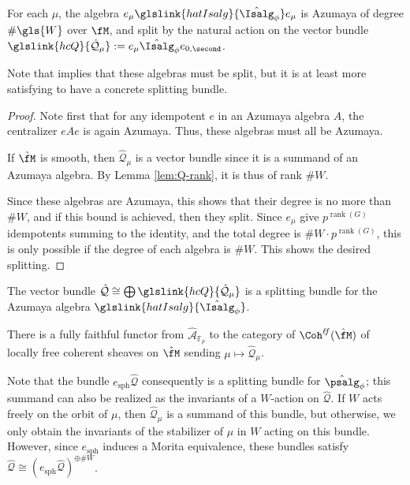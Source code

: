 \begin{lemma}
  For each $\mu$, the algebra $e_\mu\glslink{hatIsalg}{\hat{\Isalg}_\phi} e_\mu$ is Azumaya of degree $\#\gls{W}$ over $\fM$, and split by the natural action on the vector bundle $\glslink{hcQ}{\mathcal{\hat Q}_\mu}:=e_\mu\hat{\Isalg}_\phi e_{0,\second}$.
\end{lemma}
Note that \cite[Prop. 1.24]{BKpos} implies that these algebras must be split, but it is at least more satisfying to have a concrete splitting bundle. 
\begin{proof}
 Note first that for any idempotent $e$ in an Azumaya algebra $A$, the centralizer $eAe$ is again Azumaya.  Thus, these algebras must all be Azumaya.

 If $\tilde{\fM}$ is smooth, then  $\mathcal{\hat Q}_\mu$ is a vector bundle since it is a summand of an Azumaya algebra.  By Lemma \ref{lem:Q-rank}, it is thus of rank $\#W$.
  
  Since these algebras are Azumaya, this shows that their degree is no more than $\# W$, and if this bound is achieved, then they split. Since $e_\mu$ give $p^{\operatorname{rank}(G)}$ idempotents summing to the identity, and the total degree is $\# W\cdot p^{\operatorname{rank}(G)}$, this is only possible if the degree of each algebra is $\#W$. This shows the desired splitting.
\end{proof}

\begin{corollary}\label{cor:Q-splitting}
  The vector bundle $\hat{\mathcal{Q}}\cong \bigoplus\glslink{hcQ}{ \hat{\mathcal{Q}}_\mu}$ is a splitting bundle for the Azumaya algebra $\glslink{hatIsalg}{\hat{\Isalg}_\phi}$.

There is a fully faithful functor from  $\widehat{\mathscr{A}}_{\mathbb{F}_p}$ to the category of $\Coh^{\ell \!f}(\hat{\fM})$ of locally free coherent sheaves on $\hat{\fM}$ sending  $\mu\mapsto \hat{\mathcal{Q}}_\mu$.  
\end{corollary}

Note that the bundle $e_{\operatorname{sph}}\hat{\mathcal{Q}}$ consequently is a splitting bundle for $\hat{\psalg} _\phi$; this summand can also be realized 
as the invariants of a $W$-action on $\hat{\mathcal{Q}}$.   If $W$ acts freely on the orbit of $\mu$, then $\hat{\mathcal{Q}}_\mu$ is a summand of this bundle, but otherwise, we only obtain the invariants of the stabilizer of $\mu$ in $W$ acting on this bundle.  However, since $e_{\operatorname{sph}}$ induces a Morita equivalence, these bundles satisfy $\hat{\mathcal{Q}}\cong (e_{\operatorname{sph}}\hat{\mathcal{Q}})^{\oplus \# W}$.  


